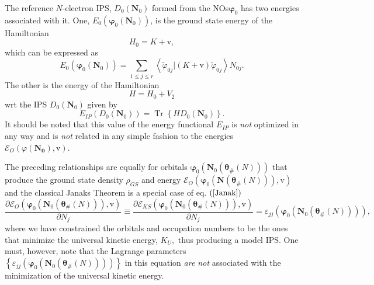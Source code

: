 \documentclass[aps,preprint]{revtex4}%
\begin{document}
The reference $N$-electron IPS, $D_{0}\left(  \boldsymbol{\boldsymbol{N}}%
_{0}\right)  $ formed from the NOs$\boldsymbol{\varphi}_{0}$ has two energies
associated with it. One, $E_{0}\left(  \boldsymbol{\varphi}_{0}\left(
\boldsymbol{N}_{0}\right)  \right)  $, is the ground state energy of the
Hamiltonian%
\begin{equation}
H_{0}=K+\mathrm{v},
\end{equation}
which can be expressed as
\begin{equation}
E_{0}\left(  \boldsymbol{\varphi}_{0}\left(  \boldsymbol{N}_{0}\right)
\right)  =\sum_{1\leq j\leq r}\left\langle \tilde{\varphi}_{0j}\left\vert
\left(  K+\mathrm{v}\right)  \right.  \tilde{\varphi}_{0j}\right\rangle
N_{0j}.
\end{equation}
The other is the energy of the Hamiltonian
\begin{equation}
H=H_{0}+V_{2}%
\end{equation}
wrt the IPS $D_{0}\left(  \boldsymbol{N}_{0}\right)  $ given by
\begin{equation}
E_{IP}\left(  D_{0}\left(  \boldsymbol{N}_{0}\right)  \right)
=\operatorname{Tr}\left\{  HD_{0}\left(  \boldsymbol{N}_{0}\right)  \right\}
.
\end{equation}
It should be noted that this value of the energy functional $E_{IP}$ is
\emph{not }optimized in any way and is \emph{not }related in any simple
fashion to the energies $\mathcal{E}_{O}\left(  \varphi\boldsymbol{\left(
\boldsymbol{N}_{0}\right)  },\mathrm{v}\right)  .$

The preceding relationships are equally for orbitals $\boldsymbol{\varphi}%
_{0}\left(  \boldsymbol{N}_{0}\left(  \boldsymbol{\theta}_{\#}\left(
N\right)  \right)  \right)  $ that produce the ground state density $\rho
_{GS}$ and energy $\mathcal{E}_{O}\left(  \boldsymbol{\varphi}_{0}\left(
\boldsymbol{N}\left(  \boldsymbol{\theta}_{\#}\left(  N\right)  \right)
\right)  ,\mathrm{v}\right)  $ and the classical Janaks Theorem is a special
case of eq. $\left(  \ref{Janak}\right)  $
\begin{equation}
\frac{\partial\mathcal{E}_{O}\left(  \boldsymbol{\varphi}_{0}\left(
\boldsymbol{N}_{0}\left(  \boldsymbol{\theta}_{\#}\left(  N\right)  \right)
\right)  ,\mathrm{v}\right)  }{\partial N_{j}}\equiv\frac{\partial
\mathcal{E}_{KS}\left(  \boldsymbol{\varphi}_{0}\left(  \boldsymbol{N}%
_{0}\left(  \boldsymbol{\theta}_{\#}\left(  N\right)  \right)  \right)
,\mathrm{v}\right)  }{\partial N_{j}}=\varepsilon_{jj}\left(
\boldsymbol{\varphi}_{0}\left(  \boldsymbol{N}_{0}\left(  \boldsymbol{\theta
}_{\#}\left(  N\right)  \right)  \right)  \right)  , \label{ClassJanak}%
\end{equation}
where we have constrained the orbitals and occupation numbers to be the ones
that minimize the universal kinetic energy, $K_{U},$ thus producing a model
IPS. One must, however, note that the Lagrange parameters $\left\{
\varepsilon_{jj}\left(  \boldsymbol{\varphi}_{0}\left(  \boldsymbol{N}%
_{0}\left(  \boldsymbol{\theta}_{\#}\left(  N\right)  \right)  \right)
\right)  \right\}  $ in this equation \emph{are not }associated with the
minimization of the universal kinetic energy.
\end{document}
